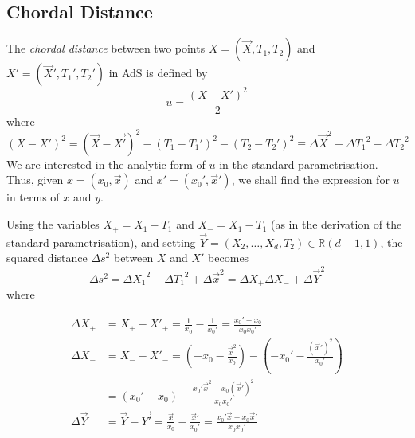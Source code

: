 \subsection{Chordal Distance}
\newcommand{\half}{\frac{1}{2}}

The \emph{chordal distance} between two points $X=(\vec{X},T_1,T_2)$ and $X'=(\vec{X}',T_1',T_2')$ in AdS is defined by
$$u=\frac{(X-X')^2}{2}$$
where
$$(X-X')^2=(\vec{X}-\vec{X'})^2-(T_1-T_1')^2-(T_2-T_2')^2\equiv\Delta{\vec{X}}^2-\Delta{T_1}^2-\Delta{T_2}^2$$
We are interested in the analytic form of $u$ in the standard parametrisation. Thus, given $x=(x_0,\vec{x})$ and $x'=(x_0',\vec{x}')$, we shall find the expression for $u$ in terms of $x$ and $y$.

Using the variables $X_{+}=X_1-T_1$ and $X_{-}=X_1-T_1$ (as in the derivation of the standard parametrisation), and setting $\vec{Y}=(X_2,\dots,X_d,T_2)\in\mathbb{R}(d-1,1)$, the squared distance $\Delta{s}^2$ between $X$ and $X'$ becomes
$$\Delta{s}^2 = \Delta{X_1}^2 - \Delta{T_1}^2 + \Delta{\vec{x}}^2 = \Delta{X_{+}} \Delta{X_{-}} + \Delta{\vec{Y}}^2$$
where

\begin{align}
\Delta{X_{+}} &= X_{+}-X'_{+} = \frac{1}{x_{0}} - \frac{1}{x_{0}'} = \frac{x_{0}' - x_{0}}{x_{0}x_{0}'}\\
\Delta{X_{-}} &= X_{-}-X'_{-} = \left(-x_{0}-\frac{\vec{x}^2}{x_{0}}\right) - \left(-x_{0}'-\frac{(\vec{x}')^2}{x_{0}'}\right)\nonumber\\
&= (x_{0}'-x_{0})-\frac{x_{0}' \vec{x}^2 - x_{0} (\vec{x}')^2}{x_{0}x_{0}'}\\
\Delta{\vec{Y}}\phantom{_-} &= \vec{Y}-\vec{Y'}=\frac{\vec{x}}{x_{0}} - \frac{\vec{x}'}{x_{0}'} = \frac{x_{0}' \vec{x} - x_{0} \vec{x}'}{x_{0}x_{0}'}
\end{align}

